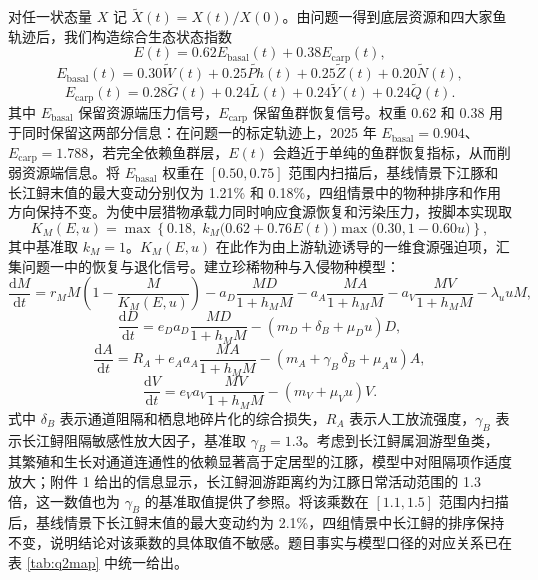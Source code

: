 \documentclass{MMCStyle}
\begin{document}
对任一状态量 $X$ 记 $\widetilde X(t)=X(t)/X(0)$。由问题一得到底层资源和四大家鱼轨迹后，我们构造综合生态状态指数
\begin{equation}
E(t)=0.62E_{\text{basal}}(t)+0.38E_{\text{carp}}(t),
\end{equation}
\begin{equation}
E_{\text{basal}}(t)=0.30\widetilde W(t)+0.25\widetilde{Ph}(t)+0.25\widetilde Z(t)+0.20\widetilde N(t),
\end{equation}
\begin{equation}
E_{\text{carp}}(t)=0.28\widetilde G(t)+0.24\widetilde L(t)+0.24\widetilde Y(t)+0.24\widetilde Q(t).
\end{equation}
其中 $E_{\text{basal}}$ 保留资源端压力信号，$E_{\text{carp}}$ 保留鱼群恢复信号。权重 0.62 和 0.38 用于同时保留这两部分信息：在问题一的标定轨迹上，2025 年 $E_{\text{basal}}=0.904$、$E_{\text{carp}}=1.788$，若完全依赖鱼群层，$E(t)$ 会趋近于单纯的鱼群恢复指标，从而削弱资源端信息。将 $E_{\text{basal}}$ 权重在 $[0.50,0.75]$ 范围内扫描后，基线情景下江豚和长江鲟末值的最大变动分别仅为 1.21\% 和 0.18\%，四组情景中的物种排序和作用方向保持不变。为使中层猎物承载力同时响应食源恢复和污染压力，按脚本实现取
\begin{equation}
K_M(E,u)=\max\left\{0.18,\;k_M\bigl(0.62+0.76E(t)\bigr)\max\bigl(0.30,1-0.60u\bigr)\right\},
\end{equation}
其中基准取 $k_M=1$。$K_M(E,u)$ 在此作为由上游轨迹诱导的一维食源强迫项，汇集问题一中的恢复与退化信号。建立珍稀物种与入侵物种模型\cite{holling1959}：
\begin{equation}
\frac{\mathrm{d}M}{\mathrm{d}t}
=r_M M\left(1-\frac{M}{K_M(E,u)}\right)
-a_D\frac{MD}{1+h_MM}
-a_A\frac{MA}{1+h_MM}
-a_V\frac{MV}{1+h_MM}
-\lambda_u uM,
\end{equation}
\begin{equation}
\frac{\mathrm{d}D}{\mathrm{d}t}
=e_D a_D\frac{MD}{1+h_MM}-(m_D+\delta_B+\mu_Du)D,
\end{equation}
\begin{equation}
\frac{\mathrm{d}A}{\mathrm{d}t}
=R_A+e_A a_A\frac{MA}{1+h_MM}-(m_A+\gamma_B\,\delta_B+\mu_Au)A,
\end{equation}
\begin{equation}
\frac{\mathrm{d}V}{\mathrm{d}t}
=e_V a_V\frac{MV}{1+h_MM}-(m_V+\mu_Vu)V.
\end{equation}
式中 $\delta_B$ 表示通道阻隔和栖息地碎片化的综合损失，$R_A$ 表示人工放流强度，$\gamma_B$ 表示长江鲟阻隔敏感性放大因子，基准取 $\gamma_B=1.3$。考虑到长江鲟属洄游型鱼类，其繁殖和生长对通道连通性的依赖显著高于定居型的江豚，模型中对阻隔项作适度放大；附件 1 给出的信息显示，长江鲟洄游距离约为江豚日常活动范围的 1.3 倍，这一数值也为 $\gamma_B$ 的基准取值提供了参照。将该乘数在 $[1.1,1.5]$ 范围内扫描后，基线情景下长江鲟末值的最大变动约为 2.1\%，四组情景中长江鲟的排序保持不变，说明结论对该乘数的具体取值不敏感。题目事实与模型口径的对应关系已在表 \ref{tab:q2map} 中统一给出。
\end{document}
